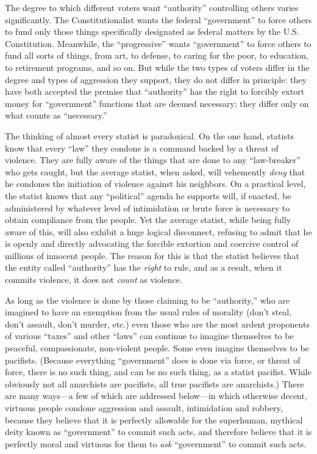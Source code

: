 \documentclass{book}
\begin{document}
The degree to which different voters want \enquote{authority} controlling others varies significantly. The Constitutionalist wants the federal \enquote{government} to force others to fund only those things specifically designated as federal matters by the U.S. Constitution. Meanwhile, the \enquote{progressive} wants \enquote{government} to force others to fund all sorts of things, from art, to defense, to caring for the poor, to education, to retirement programs, and so on. But while the two types of voters differ in the degree and types of aggression they support, they do not differ in principle: they have both accepted the premise that \enquote{authority} has the right to forcibly extort money for \enquote{government} functions that are deemed necessary; they differ only on what counts as \enquote{necessary.}

The thinking of almost every statist is paradoxical. On the one hand, statists know that every \enquote{law} they condone is a command backed by a threat of violence. They are fully aware of the things that are done to any \enquote{law-breaker} who gets caught, but the average statist, when asked, will vehemently \emph{deny} that he condones the initiation of violence against his neighbors. On a practical level, the statist knows that any \enquote{political} agenda he supports will, if enacted, be administered by whatever level of intimidation or brute force is necessary to obtain compliance from the people. Yet the average statist, while being fully aware of this, will also exhibit a huge logical disconnect, refusing to admit that he is openly and directly advocating the forcible extortion and coercive control of millions of innocent people. The reason for this is that the statist believes that the entity called \enquote{authority} has the \emph{right} to rule, and as a result, when it commits violence, it does not \emph{count} as violence.

As long as the violence is done by those claiming to be \enquote{authority,} who are imagined to have an exemption from the usual rules of morality (don't steal, don't assault, don't murder, etc.) even those who are the most ardent proponents of various \enquote{taxes} and other \enquote{laws} can continue to imagine themselves to be peaceful, compassionate, non-violent people. Some even imagine themselves to be pacifists. (Because everything \enquote{government} does is done via force, or threat of force, there is no such thing, and can be no such thing, as a statist pacifist. While obviously not all anarchists are pacifists, all true pacifists are anarchists.) There are many ways---a few of which are addressed below---in which otherwise decent, virtuous people condone aggression and assault, intimidation and robbery, because they believe that it is perfectly allowable for the superhuman, mythical deity known as \enquote{government} to commit such acts, and therefore believe that it is perfectly moral and virtuous for them to \emph{ask} \enquote{government} to commit such acts.
\end{document}
